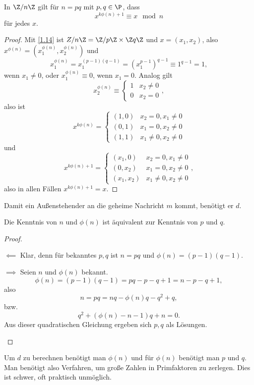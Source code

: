 \setcounter{thm}{1}
\begin{lem} \label{3.2}
	In $\Z / n \Z$ gilt für $n = pq$ mit $p,q \in \P$, dass
	\[
		x^{k\phi(n) + 1} \equiv x \mod n
	\]
	für jedes $x$.
	\begin{proof}
		Mit \ref{1.14} ist $Z / n\Z = \Z /p\Z \times \Z q\Z$ und $x = (x_1, x_2)$, also $x^{\phi(n)} = (x_1^{\phi(n)}, x_2^{\phi(n)})$ und
		\[
			x_1^{\phi(n)}
			= x_1^{(p-1)(q-1)}
			= (x_1^{p-1})^{q-1}
			\equiv 1^{q-1}
			= 1,
		\]
		wenn $x_1 \neq 0$, oder $x_1^{\phi(n)} \equiv 0$, wenn $x_1 = 0$.
		Analog gilt
		\[
			x_2^{\phi(n)} \equiv \begin{cases}
				1 & x_2 \neq 0 \\
				0 & x_2 = 0
			\end{cases},
		\]
		also ist
		\[
			x^{k\phi(n)} = \begin{cases}
				(1, 0) & x_2=0, x_1 \neq 0 \\
				(0,1) & x_1=0, x_2 \neq 0 \\
				(1,1) & x_1\neq 0, x_2 \neq 0
			\end{cases}
		\]
		und
		\[
			x^{k\phi(n) + 1} = \begin{cases}
				(x_1, 0) & x_2=0, x_1 \neq 0 \\
				(0,x_2) & x_1=0, x_2 \neq 0 \\
				(x_1,x_2) & x_1\neq 0, x_2 \neq 0
			\end{cases},
		\]
		also in allen Fällen $x^{k\phi(n) + 1} = x$.
	\end{proof}
\end{lem}

Damit ein Außenstehender an die geheime Nachricht $m$ kommt, benötigt er $d$.

\begin{lem} \label{3.3}
	Die Kenntnis von $n$ und $\phi(n)$ ist äquivalent zur Kenntnis von $p$ und $q$.
	\begin{proof}
		\begin{segnb}{$\impliedby$}
			Klar, denn für bekanntes $p, q$ ist $n = pq$ und $\phi(n) = (p-1)(q-1)$.
		\end{segnb}
		\begin{segnb}{$\implies$}
			Seien $n$ und $\phi(n)$ bekannt.
			\[
				\phi(n)
				= (p-1)(q-1)
				= pq - p - q + 1
				= n - p - q + 1,
			\]
			also
			\[
				n = pq = nq - \phi(n)q - q^2 + q,
			\]
			bzw.
			\[
				q^2 + (\phi(n) - n - 1)q + n = 0.
			\]
			Aus dieser quadratischen Gleichung ergeben sich $p, q$ als Lösungen.
		\end{segnb}
	\end{proof}
\end{lem}

Um $d$ zu berechnen benötigt man $\phi(n)$ und für $\phi(n)$ benötigt man $p$ und $q$.
Man benötigt also Verfahren, um große Zahlen in Primfaktoren zu zerlegen.
Dies ist schwer, oft praktisch unmöglich.


